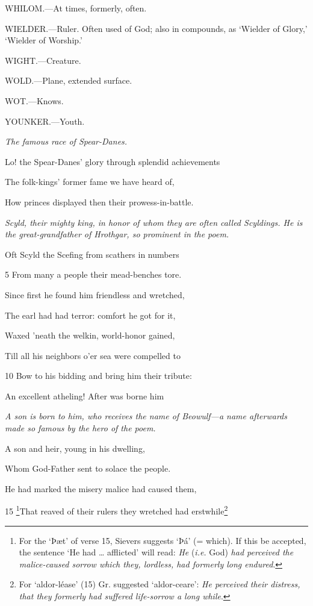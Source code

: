WHILOM.—At times, formerly, often.

WIELDER.—Ruler. Often used of God; also in compounds, as ‘Wielder of Glory,’ ‘Wielder of Worship.’

WIGHT.—Creature.

WOLD.—Plane, extended surface.

WOT.—Knows.

YOUNKER.—Youth.



\emph{The famous race of
Spear-Danes.}

Lo! the Spear-Danes’ glory through splendid achievements

The folk-kings’ former fame we have heard of,

How princes displayed then their prowess-in-battle.

\emph{Scyld, their mighty
king, in honor of
whom they are
often called Scyldings.
He is the
great-grandfather
of Hrothgar, so
prominent in the
poem.}

Oft Scyld the Scefing from scathers in numbers

5
From many a people their mead-benches tore.

Since first he found him friendless and wretched,

The earl had had terror: comfort he got for it,

Waxed ’neath the welkin, world-honor gained,

Till all his neighbors o’er sea were compelled to

10
Bow to his bidding and bring him their tribute:

An excellent atheling! After was borne him

\emph{A son is born to
him, who receives
the name of
Beowulf—a name
afterwards made so
famous by the hero
of the poem.}

A son and heir, young in his dwelling,

Whom God-Father sent to solace the people.

He had marked the misery malice had caused them,

15
\footnote{For the ‘Þæt’ of verse 15, Sievers suggests ‘Þá’ (= which). If this be
accepted, the sentence ‘He had … afflicted’ will read: \emph{He} (\emph{i.e.} God) \emph{had
perceived the malice-caused sorrow which they, lordless, had formerly long
endured}.}That reaved of their rulers they wretched had erstwhile\footnote{For ‘aldor-léase’ (15) Gr. suggested ‘aldor-ceare’: \emph{He perceived their
distress, that they formerly had suffered life-sorrow a long while}.}

